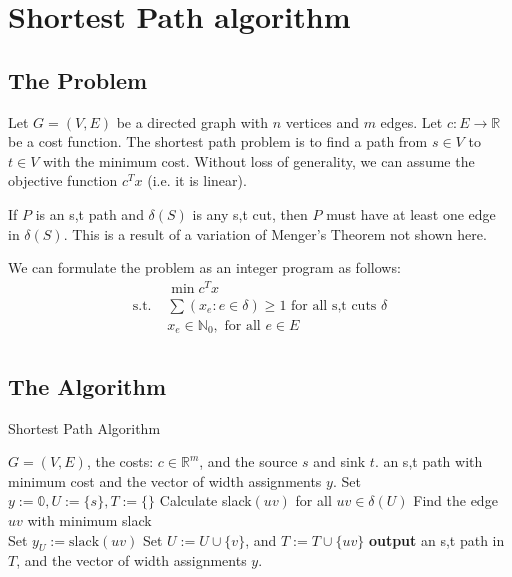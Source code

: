 \documentclass[a4paper]{report}
\begin{document}
	\section{Shortest Path algorithm}
	\subsection{The Problem}
	\begin{definition}
		Let $G = (V, E)$ be a directed graph with $n$ vertices and $m$ edges. Let
		$c : E \rightarrow \mathbb{R}$ be a cost function. The shortest path problem
		is to find a path from $s \in V$ to $t \in V$ with the minimum cost. Without
		loss of generality, we can assume the objective function $c^{T} x$ (i.e. it is
		linear).

		\begin{corollary}
			If $P$ is an s,t path and $\delta(S)$ is any s,t cut, then $P$ must have
			at least one edge in $\delta(S)$. This is a result of a variation of Menger's
			Theorem not shown here.
		\end{corollary}
	\end{definition}
	We can formulate the problem as an integer program as follows:
	\begin{align*}
		             & \min c^{T} x                                                       \\
		\text{s.t. } & \sum (x_{e} : e \in \delta) \geq 1 \text{ for all s,t cuts }\delta \\
		             & x_{e} \in \mathbb{N}_{0}, \text{ for all }e \in E                  \\
	\end{align*}

	\subsection{The Algorithm}
	\begin{algorithm}
		 \algrenewcommand{}
		\algrenewcommand{}
		\caption{Shortest Path Algorithm}
		\label{alg:path}
		\begin{algorithmic}
			[1] \Require $G = (V, E)$, the costs: $c \in \mathbb{R}^{m}$, and the
			source $s$ and sink $t$. \Ensure an s,t path with minimum cost and the vector
			of width assignments $y$. \State Set
			$y := \mathbb{0}, U := \{s\}, T := \{\}$  \State Calculate
			slack$(uv)$ for all $uv \in \delta(U)$ \State Find the edge $uv$ with
			minimum slack \\ 
			\State Set $y_{U} := \text{slack}(uv)$ \State Set $U := U \cup \{v\}$, and
			$T := T \cup \{uv\}$ \EndWhile {}
			\State \textbf{output} an s,t path in $T$, and the vector of width assignments
			$y$.
		\end{algorithmic}
	\end{algorithm}
\end{document}
